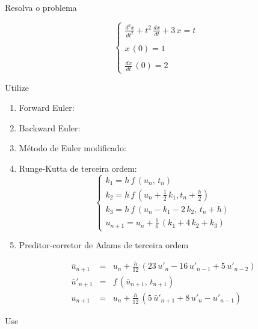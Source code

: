 \begin{example}

Resolva o problema

\[
 \left\{
 \begin{array}{l}
  \displaystyle \frac{d^2x}{dt^2} + t^2 \, \frac{dx}{dt} + 3 \, x = t \\
  \\
  x \, (0) = 1 \\
  \\
  \displaystyle \frac{dx}{dt} \, (0) = 2
 \end{array}
 \right.
\]

Utilize

\begin{enumerate}

\item Forward Euler: 

\item Backward Euler: 

\item Método de Euler modificado: 

\item Runge-Kutta de terceira ordem:
\[
 \left\{
 \begin{array}{l}
  k_1 = h \, f \, (u_n, \, t_n) \\
  k_2 = h \, f \, (u_n + \displaystyle \frac{1}{2} \, k_1, t_n + \frac{h}{2}) \\
  k_3 = h \, f \, (u_n - k_1 - 2 \, k_2, \, t_n + h) \\
  u_{n+1} = u_n + \displaystyle \frac{1}{6} \, (k_1 + 4 \, k_2 + k_3)
 \end{array}
 \right.
\]

\item Preditor-corretor de Adams de terceira ordem

\begin{eqnarray}
 \bar{u}_{n+1} & = & u_n + \frac{h}{12} \, (23 \, u'_n - 16 \, u'_{n-1} + 5 \, u'_{n-2}) \nonumber \\
 \bar{u}'_{n+1} & = & f \, (\bar{u}_{n+1}, \, t_{n+1}) \nonumber \\
 u_{n+1} & = & u_n + \frac{h}{12} \, (5 \, \bar{u}'_{n+1} + 8 \, u'_n - u'_{n-1}) \nonumber
\end{eqnarray}

\end{enumerate}

Use 

\end{example}
